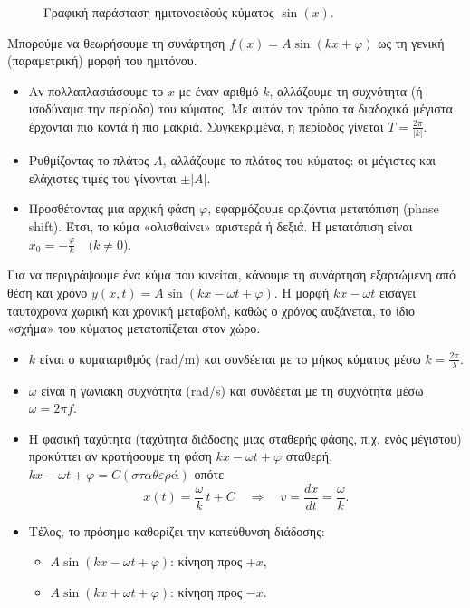 \documentclass[
  a4paper,
  11pt,
]{article}
\begin{document}
\begin{figure}[htbp]
\centering
{}
\caption{Γραφική παράσταση ημιτονοειδούς κύματος $\sin(x)$.}
\label{fig:sinx}
\end{figure}

Μπορούμε να θεωρήσουμε τη συνάρτηση \(f(x)=A\sin(kx+\varphi)\) ως τη
γενική (παραμετρική) μορφή του ημιτόνου.

\begin{itemize}
\item
  Αν πολλαπλασιάσουμε το \(x\) με έναν αριθμό \(k\), αλλάζουμε τη
  συχνότητα (ή ισοδύναμα την περίοδο) του κύματος. Με αυτόν τον τρόπο τα
  διαδοχικά μέγιστα έρχονται πιο κοντά ή πιο μακριά. Συγκεκριμένα, η
  περίοδος γίνεται \(T=\frac{2\pi}{|k|}\).
\item
  Ρυθμίζοντας το πλάτος \(A\), αλλάζουμε το πλάτος του κύματος: οι
  μέγιστες και ελάχιστες τιμές του γίνονται \(\pm|A|\).
\item
  Προσθέτοντας μια αρχική φάση \(\varphi\), εφαρμόζουμε οριζόντια
  μετατόπιση (phase shift). Έτσι, το κύμα «ολισθαίνει» αριστερά ή δεξιά.
  Η μετατόπιση είναι \(x_0=-\frac{\varphi}{k}\quad (k\neq 0\)).
\end{itemize}

Για να περιγράψουμε ένα κύμα που κινείται, κάνουμε τη συνάρτηση
εξαρτώμενη από θέση και χρόνο \(y(x,t)=A\sin(kx-\omega t + \varphi)\). Η
μορφή \(kx-\omega t\) εισάγει ταυτόχρονα χωρική και χρονική μεταβολή,
καθώς ο χρόνος αυξάνεται, το ίδιο «σχήμα» του κύματος μετατοπίζεται στον
χώρο.

\begin{itemize}
\item
  \(k\) είναι ο κυματαριθμός (rad/m) και συνδέεται με το μήκος κύματος
  μέσω \(k=\frac{2\pi}{\lambda}\).
\item
  \(\omega\) είναι η γωνιακή συχνότητα (rad/s) και συνδέεται με τη
  συχνότητα μέσω \(\omega=2\pi f\).
\item
  Η φασική ταχύτητα (ταχύτητα διάδοσης μιας σταθερής φάσης, π.χ. ενός
  μέγιστου) προκύπτει αν κρατήσουμε τη φάση \(kx-\omega t+\varphi\)
  σταθερή, \(kx-\omega t+\varphi = C (σταθερά)\) οπότε \[
  x(t)=\frac{\omega}{k}\,t+C
  \quad\Rightarrow\quad
  v=\frac{dx}{dt}=\frac{\omega}{k}.
  \]
\item
  Τέλος, το πρόσημο καθορίζει την κατεύθυνση διάδοσης:

  \begin{itemize}
  \item
    \(A\sin(kx-\omega t+\varphi)\): κίνηση προς \(+x\),
  \item
    \(A\sin(kx+\omega t+\varphi)\): κίνηση προς \(-x\).
  \end{itemize}
\end{itemize}
\end{document}
